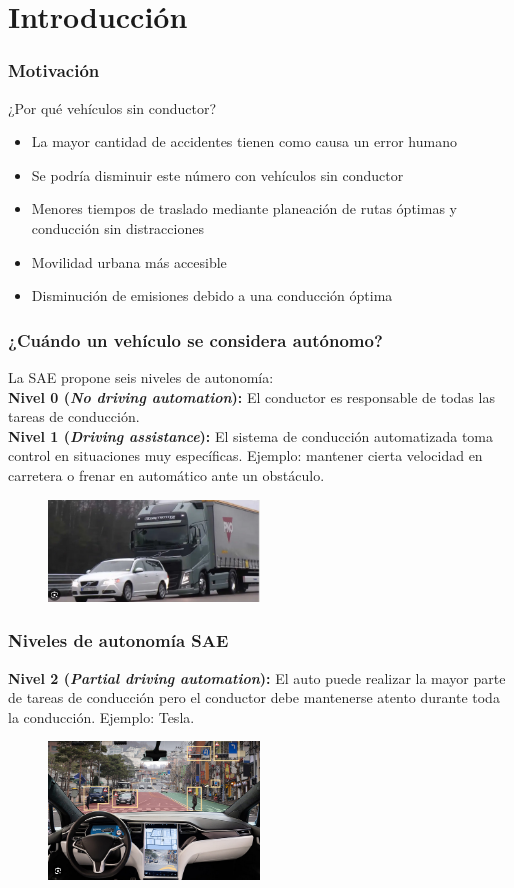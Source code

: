 \section{Introducción}

\begin{frame}\frametitle{Motivación}
  ¿Por qué vehículos sin conductor?
  \begin{itemize}
  \item La mayor cantidad de accidentes tienen como causa un error humano
  \item Se podría disminuir este número con vehículos sin conductor
  \item Menores tiempos de traslado mediante planeación de rutas óptimas y conducción sin distracciones
  \item Movilidad urbana más accesible
  \item Disminución de emisiones debido a una conducción óptima
  \end{itemize}
\end{frame}

\begin{frame}\frametitle{¿Cuándo un vehículo se considera autónomo?}
  La SAE propone seis niveles de autonomía:
  \[\]
  \textbf{Nivel 0 (\textit{No driving automation}):} El conductor es responsable de todas las tareas de conducción.
  \[\]
  \textbf{Nivel 1 (\textit{Driving assistance}):} El sistema de conducción automatizada toma control en situaciones muy específicas. Ejemplo: mantener cierta velocidad en carretera o frenar en automático ante un obstáculo.
  \begin{figure}
    \centering
    \includegraphics[width=0.5\textwidth]{Figuras/EjemploSAE1.png}
  \end{figure}
\end{frame}

\begin{frame}\frametitle{Niveles de autonomía SAE}
  \textbf{Nivel 2 (\textit{Partial driving automation}):} El auto puede realizar la mayor parte de tareas de conducción pero el conductor debe mantenerse atento durante toda la conducción. Ejemplo: Tesla.
  \begin{figure}
    \centering
    \includegraphics[width=0.5\textwidth]{Figuras/EjemploSAE2.png}
  \end{figure}
\end{frame}

